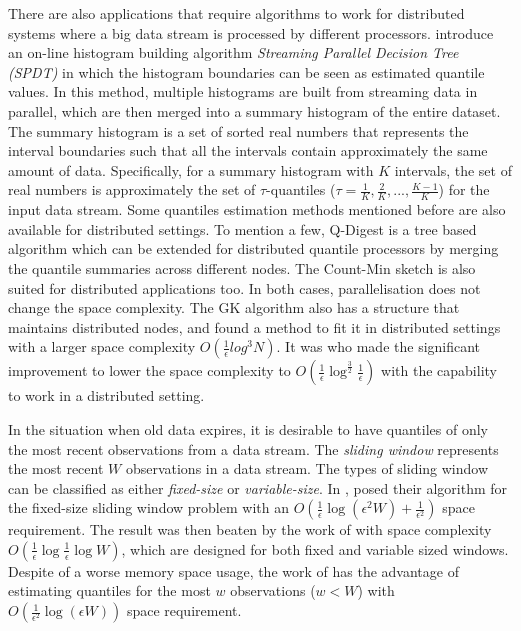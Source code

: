There are also applications that require algorithms to work for distributed systems where a big data stream is processed by different processors.
\citeauthor{ben-haimStreamingParallelDecision2010}\cite{ben-haimStreamingParallelDecision2010} introduce an on-line histogram building algorithm \textit{Streaming Parallel Decision Tree (SPDT)} in which the histogram boundaries can be seen as estimated quantile values.
In this method, multiple histograms are built from streaming data in parallel, which are then merged into a summary histogram of the entire dataset. The summary histogram is a set of sorted real numbers that represents the interval boundaries such that all the intervals contain approximately the same amount of data. Specifically, for a summary histogram with $K$ intervals, the set of real numbers is approximately the set of $\tau$-quantiles ($\tau = \frac{1}{K}, \frac{2}{K}, ..., \frac{K-1}{K}$) for the input data stream.
Some quantiles estimation methods mentioned before are also available for distributed settings. To mention a few,
{Q-Digest}\cite{shrivastavaMediansNewAggregation2004b} is a tree based algorithm which can be extended for distributed quantile processors by merging the quantile summaries across different nodes. The Count-Min sketch\cite{cormodeImprovedDataStream2005} is also suited for distributed applications too. In both cases, parallelisation does not change the space complexity.
The {GK} algorithm also has a structure that maintains distributed nodes, and \citeauthor{greenwaldPowerconservingComputationOrderstatistics2004}\cite{greenwaldPowerconservingComputationOrderstatistics2004} found a method to fit it in distributed settings with a larger space complexity $O(\frac{1}{\epsilon}log^3 N)$.
It was \citeauthor{agarwalMergeableSummaries2013}\cite{agarwalMergeableSummaries2013} who made the significant improvement to lower the space complexity to 
$O(\frac{1}{\epsilon}\log^{\frac{3}{2}}\frac{1}{\epsilon})$
with the capability to work in a distributed setting.

In the situation when old data expires, it is desirable to have quantiles of only the most recent observations from a data stream.
The \textit{sliding window} represents the most recent $W$ observations in a data stream. The types of sliding window can be classified as either \textit{fixed-size} or \textit{variable-size}.
In \cite{linContinuouslyMaintainingQuantile2004}, \citeauthor{linContinuouslyMaintainingQuantile2004} posed their algorithm for the fixed-size sliding window problem with an 
$O(\frac{1}{\epsilon} \log (\epsilon^2 W) + \frac{1}{\epsilon^2})$ space requirement.
The result was then beaten by the work of \citeauthor{arasuApproximateCountsQuantiles2004}\cite{arasuApproximateCountsQuantiles2004} with space complexity 
$O(\frac{1}{\epsilon} \log\frac{1}{\epsilon} \log W)$,
which are designed for both fixed and variable sized windows.
Despite of a worse memory space usage, the work of \citeauthor{linContinuouslyMaintainingQuantile2004}\cite{linContinuouslyMaintainingQuantile2004} has the advantage of estimating quantiles for the most $w$ observations ($w < W$) with $O(\frac{1}{\epsilon^2} \log (\epsilon W))$ space requirement.


